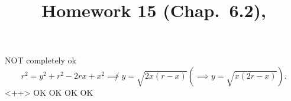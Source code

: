 \documentclass[10pt]{article} %
\title{Homework 15 (Chap.~6.2),
}
\begin{document}
\maketitle
{}
NOT completely ok
\begin{equation*}
	r^2=y^2+r^2-2rx+x^2\not\implies
	y=\sqrt{2x(r-x)}\left( \implies y=\sqrt{x(2r-x)} \right).
\end{equation*}<++>
OK
OK
OK
OK
\end{document}
